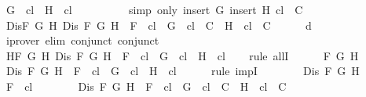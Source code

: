 \begin{isabellebody}
\ {\isachardoublequoteopen}G\ {\isasymin}\ {\isacharquery}cl\ {\isasymand}\ H\ {\isasymin}\ {\isacharquery}cl{\isachardoublequoteclose}\isanewline
\ \ \ \ \ \ \ \ \isamarkupfalse%
\ {\isacharparenleft}simp\ only{\isacharcolon}\ {\isacartoucheopen}insert\ G\ {\isacharparenleft}insert\ H\ {\isacharquery}cl{\isacharparenright}\ {\isasymin}\ C{\isacartoucheclose}{\isacharparenright}\ \isanewline
\ \ \ \ \isamarkupfalse%
\isanewline
\ \ \isamarkupfalse%
\isanewline
\ \ \isamarkupfalse%
\ Dis{\isacharcolon}{\isachardoublequoteopen}{\isasymforall}F\ G\ H{\isachardot}\ Dis\ F\ G\ H\ {\isasymlongrightarrow}\ F\ {\isasymin}\ {\isacharquery}cl\ {\isasymlongrightarrow}\ {\isacharbraceleft}G{\isacharbraceright}\ {\isasymunion}\ {\isacharquery}cl\ {\isasymin}\ C\ {\isasymor}\ {\isacharbraceleft}H{\isacharbraceright}\ {\isasymunion}\ {\isacharquery}cl\ {\isasymin}\ C{\isachardoublequoteclose}\isanewline
\ \ \ \ \isamarkupfalse%
\ d\ \isamarkupfalse%
\ {\isacharparenleft}iprover\ elim{\isacharcolon}\ conjunct{}\ conjunct{}{\isacharparenright}\isanewline
\ \ \isamarkupfalse%
\ H{}{\isacharcolon}{\isachardoublequoteopen}{\isasymforall}F\ G\ H{\isachardot}\ Dis\ F\ G\ H\ {\isasymlongrightarrow}\ F\ {\isasymin}\ {\isacharquery}cl\ {\isasymlongrightarrow}\ G\ {\isasymin}\ {\isacharquery}cl\ {\isasymor}\ H\ {\isasymin}\ {\isacharquery}cl{\isachardoublequoteclose}\isanewline
\ \ \isamarkupfalse%
\ {\isacharparenleft}rule\ allI{\isacharparenright}{\isacharplus}\isanewline
\ \ \ \ \isamarkupfalse%
\ F\ G\ H\isanewline
\ \ \ \ \isamarkupfalse%
\ {\isachardoublequoteopen}Dis\ F\ G\ H\ {\isasymlongrightarrow}\ F\ {\isasymin}\ {\isacharquery}cl\ {\isasymlongrightarrow}\ G\ {\isasymin}\ {\isacharquery}cl\ {\isasymor}\ H\ {\isasymin}\ {\isacharquery}cl{\isachardoublequoteclose}\isanewline
\ \ \ \ \isamarkupfalse%
\ {\isacharparenleft}rule\ impI{\isacharparenright}{\isacharplus}\isanewline
\ \ \ \ \ \ \isamarkupfalse%
\ {\isachardoublequoteopen}Dis\ F\ G\ H{\isachardoublequoteclose}\isanewline
\ \ \ \ \ \ \isamarkupfalse%
\ {\isachardoublequoteopen}F\ {\isasymin}\ {\isacharquery}cl{\isachardoublequoteclose}\isanewline
\ \ \ \ \ \ \isamarkupfalse%
\ {\isachardoublequoteopen}Dis\ F\ G\ H\ {\isasymlongrightarrow}\ F\ {\isasymin}\ {\isacharquery}cl\ {\isasymlongrightarrow}\ {\isacharbraceleft}G{\isacharbraceright}\ {\isasymunion}\ {\isacharquery}cl\ {\isasymin}\ C\ {\isasymor}\ {\isacharbraceleft}H{\isacharbraceright}\ {\isasymunion}\ {\isacharquery}cl\ {\isasymin}\ C{\isachardoublequoteclose}\isanewline

\end{isabellebody}
